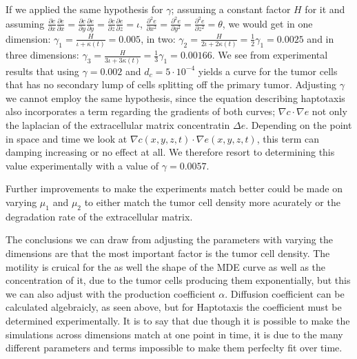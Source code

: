 If we applied the same hypothesis for $\gamma$; assuming a constant factor $H$ for it and assuming $\frac{\partial c}{\partial x}\frac{\partial e}{\partial x}=\frac{\partial c}{\partial y}\frac{\partial e}{\partial y}=\frac{\partial c}{\partial z}\frac{\partial e}{\partial z}=\iota$, $\frac{\partial^{2}e}{\partial x^{2}}=\frac{\partial^{2}e}{\partial y^{2}}=\frac{\partial^{2}e}{\partial z^{2}}=\theta$, we would get in one dimension: $\gamma_1 = \frac{H}{\iota + \kappa(t)} = 0.005$, in two: $\gamma_2 = \frac{H}{2\iota + 2\kappa(t)} = \frac{1}{2} \gamma_1 = 0.0025$ and in three dimensions: $\gamma_3 = \frac{H}{3\iota + 3\kappa(t)} = \frac{1}{3} \gamma_1 = 0.00166$. We see from experimental results that using $\gamma=0.002$ and $d_c=5\cdot 10^{-4}$ yields a curve for the tumor cells that has no secondary lump of cells splitting off the primary tumor. Adjusting $\gamma$ we cannot employ the same hypothesis, since the equation describing haptotaxis also incorporates a term regarding the gradients of both curves; $\nabla c \cdot \nabla e$ not only the laplacian of the extracellular matrix concentratin $\Delta e$. Depending on the point in space and time we look at $\nabla c(x,y,z,t) \cdot \nabla e(x,y,z,t)$, this term can damping increasing or no effect at all. We therefore resort to determining this value experimentally with a value of $\gamma=0.0057$.

Further improvements to make the experiments match better could be made on varying $\mu_1$ and $\mu_2$ to either match the tumor cell density more acurately or the degradation rate of the extracellular matrix.

The conclusions we can draw from adjusting the parameters with varying the dimensions are that the most important factor is the tumor cell density. The motility is cruical for the as well the shape of the MDE curve as well as the concentration of it, due to the tumor cells producing them exponentially, but this we can also adjust with the production coefficient $\alpha$. Diffusion coefficient can be calculated algebraicly, as seen above, but for Haptotaxis the coefficient must be determined experimentally. It is to say that due though it is possible to make the simulations across dimensions match at one point in time, it is due to the many different parameters and terms impossible to make them perfeclty fit over time.



